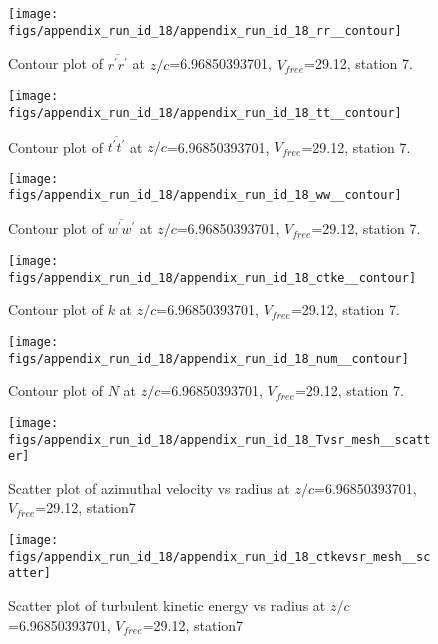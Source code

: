 \begin{figure}[H]
\centering
\texttt{[image: figs/appendix\_run\_id\_18/appendix\_run\_id\_18\_rr\_\_contour]}
\caption{Contour plot of $\overline{r^\prime r^\prime}$ at $z/c$=6.96850393701, $V_{free}$=29.12, station 7.}
\label{fig:appendix_run_id_18_rr__contour}
\end{figure}


\begin{figure}[H]
\centering
\texttt{[image: figs/appendix\_run\_id\_18/appendix\_run\_id\_18\_tt\_\_contour]}
\caption{Contour plot of $\overline{t^\prime t^\prime}$ at $z/c$=6.96850393701, $V_{free}$=29.12, station 7.}
\label{fig:appendix_run_id_18_tt__contour}
\end{figure}


\begin{figure}[H]
\centering
\texttt{[image: figs/appendix\_run\_id\_18/appendix\_run\_id\_18\_ww\_\_contour]}
\caption{Contour plot of $\overline{w^\prime w^\prime}$ at $z/c$=6.96850393701, $V_{free}$=29.12, station 7.}
\label{fig:appendix_run_id_18_ww__contour}
\end{figure}


\begin{figure}[H]
\centering
\texttt{[image: figs/appendix\_run\_id\_18/appendix\_run\_id\_18\_ctke\_\_contour]}
\caption{Contour plot of $k$ at $z/c$=6.96850393701, $V_{free}$=29.12, station 7.}
\label{fig:appendix_run_id_18_ctke__contour}
\end{figure}


\begin{figure}[H]
\centering
\texttt{[image: figs/appendix\_run\_id\_18/appendix\_run\_id\_18\_num\_\_contour]}
\caption{Contour plot of $N$ at $z/c$=6.96850393701, $V_{free}$=29.12, station 7.}
\label{fig:appendix_run_id_18_num__contour}
\end{figure}


\begin{figure}[H]
\centering
\texttt{[image: figs/appendix\_run\_id\_18/appendix\_run\_id\_18\_Tvsr\_mesh\_\_scatter]}
\caption{Scatter plot of azimuthal velocity vs radius at $z/c$=6.96850393701, $V_{free}$=29.12, station7}
\label{fig:appendix_run_id_18_Tvsr_mesh__scatter}
\end{figure}


\begin{figure}[H]
\centering
\texttt{[image: figs/appendix\_run\_id\_18/appendix\_run\_id\_18\_ctkevsr\_mesh\_\_scatter]}
\caption{Scatter plot of turbulent kinetic energy vs radius at $z/c$=6.96850393701, $V_{free}$=29.12, station7}
\label{fig:appendix_run_id_18_ctkevsr_mesh__scatter}
\end{figure}


